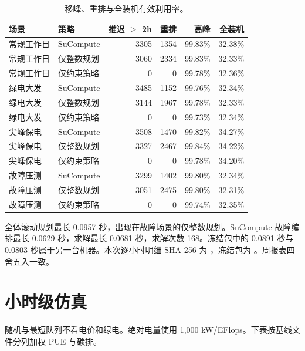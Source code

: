 \begin{table}[ht]
\centering
\caption{移峰、重排与全装机有效利用率。}
\footnotesize
\setlength{\tabcolsep}{3pt}
\begin{tabular}{llrrrr}
\toprule
场景 & 策略 & 推迟 $\ge$ 2h & 重排 & 高峰 & 全装机 \\
\midrule
常规工作日 & SuCompute & 3305 & 1354 & 99.83\% & 32.38\% \\
常规工作日 & 仅整数规划 & 3060 & 2334 & 99.83\% & 32.33\% \\
常规工作日 & 仅约束策略 & 0 & 0 & 99.78\% & 32.36\% \\
绿电大发 & SuCompute & 3485 & 1152 & 99.76\% & 32.34\% \\
绿电大发 & 仅整数规划 & 3144 & 1967 & 99.78\% & 32.33\% \\
绿电大发 & 仅约束策略 & 0 & 0 & 99.73\% & 32.34\% \\
尖峰保电 & SuCompute & 3508 & 1470 & 99.82\% & 34.27\% \\
尖峰保电 & 仅整数规划 & 3327 & 2467 & 99.84\% & 34.22\% \\
尖峰保电 & 仅约束策略 & 0 & 0 & 99.78\% & 34.20\% \\
故障压测 & SuCompute & 3299 & 1402 & 99.80\% & 32.34\% \\
故障压测 & 仅整数规划 & 3051 & 2475 & 99.80\% & 32.31\% \\
故障压测 & 仅约束策略 & 0 & 0 & 99.74\% & 32.35\% \\
\bottomrule
\end{tabular}
\end{table}

全体滚动规划最长 0.0957 秒，出现在故障场景的仅整数规划。SuCompute 故障编排最长 0.0629 秒，求解最长 0.0681 秒，求解次数 168。冻结包中的 0.0891 秒与 0.0803 秒属于另一台机器。本次逐小时明细 SHA-256 为 ，冻结包为 。周报表四舍五入一致。

\section{小时级仿真}
随机与最短队列不看电价和绿电。绝对电量使用 1{,}000 kW/EFlops。下表按基线文件分列加权 PUE 与碳排。

